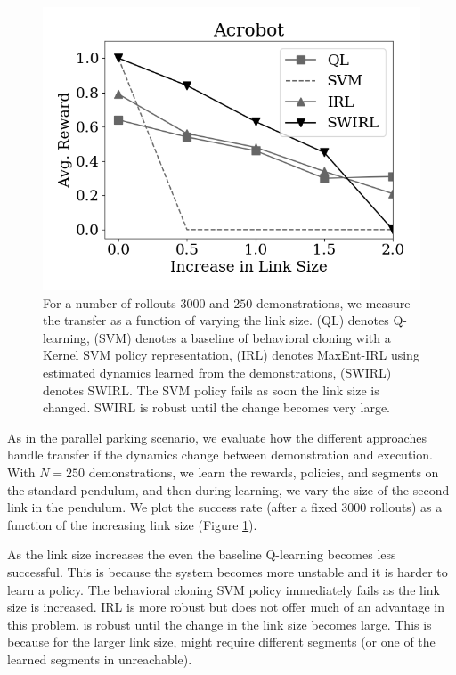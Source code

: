 \begin{figure}[t]
\centering
 \includegraphics[width=0.8\columnwidth]{swirl-experiments/acr3.png}
 \caption{For a number of rollouts $3000$ and $250$ demonstrations, we measure the transfer as a function of varying the link size. (QL) denotes Q-learning, (SVM) denotes a baseline of behavioral cloning with a Kernel SVM policy representation, (IRL) denotes MaxEnt-IRL using estimated dynamics learned from the demonstrations, (SWIRL) denotes SWIRL. The SVM policy fails as soon the link size is changed. SWIRL is robust until the change becomes very large.  \label{exp:acr3}}
\end{figure}

As in the parallel parking scenario, we evaluate how the different approaches handle transfer if the dynamics change between demonstration and execution.
With $N=250$ demonstrations, we learn the rewards, policies, and segments on the standard pendulum, and then during learning, we vary the size of the second link in the pendulum.
We plot the success rate (after a fixed 3000 rollouts) as a function of the increasing link size (Figure \ref{exp:acr3}).

As the link size increases the even the baseline Q-learning becomes less successful. This is because the system becomes more unstable and it is harder to learn a policy.
The behavioral cloning SVM policy immediately fails as the link size is increased.
IRL is more robust but does not offer much of an advantage in this problem.
\hirl is robust until the change in the link size becomes large.
This is because for the larger link size, \hirl might require different segments (or one of the learned segments in unreachable).

